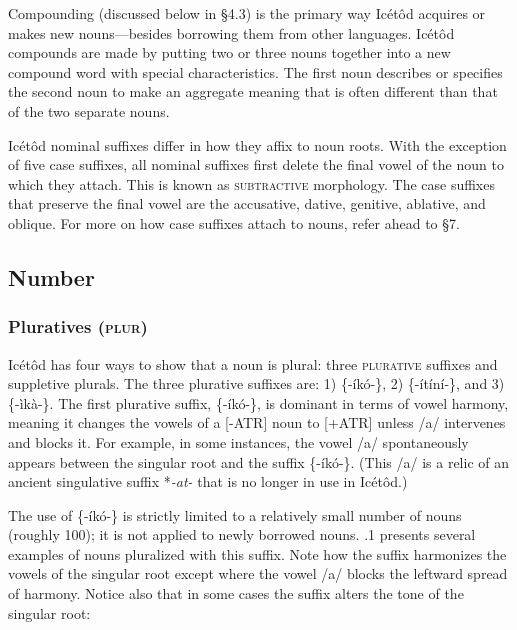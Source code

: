 Compounding (discussed below in §4.3) is the primary way Icétôd acquires or makes new nouns—besides borrowing them from other languages. Icétôd compounds are made by putting two or three nouns together into a new compound word with special characteristics. The first noun describes or specifies the second noun to make an aggregate meaning that is often different than that of the two separate nouns. 

Icétôd nominal suffixes differ in how they affix to noun roots. With the exception of five case suffixes, all nominal suffixes first delete the final vowel of the noun to which they attach. This is known as \textsc{subtractive }morphology. The case suffixes that preserve the final vowel are the accusative, dative, genitive, ablative, and oblique. For more on how case suffixes attach to nouns, refer ahead to §7.




\subsection{Number}
\subsubsection{Pluratives (\textsc{plur})}

Icétôd has four ways to show that a noun is plural: three \textsc{plurative} suffixes and suppletive plurals. The three plurative suffixes are: 1) \{-íkó-\}, 2) \{-ítíní-\}, and 3) \{-ìkà-\}. The first plurative suffix, \{-íkó-\}, is dominant in terms of vowel harmony, meaning it changes the vowels of a [-ATR] noun to [+ATR] unless /a/ intervenes and blocks it. For example, in some instances, the vowel /a/ spontaneously appears between the singular root and the suffix \{-íkó-\}. (This /a/ is a relic of an ancient singulative suffix *\textit{{}-at-} that is no longer in use in Icétôd.)

The use of \{-íkó-\} is strictly limited to a relatively small number of nouns (roughly 100); it is not applied to newly borrowed nouns. .1 presents several examples of nouns pluralized with this suffix. Note how the suffix harmonizes the vowels of the singular root except where the vowel /a/ blocks the leftward spread of harmony. Notice also that in some cases the suffix alters the tone of the singular root:


